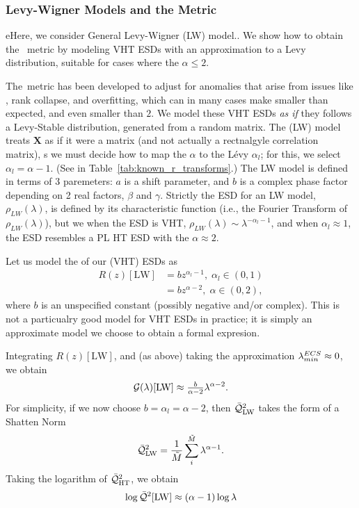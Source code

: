 \subsubsection{Levy-Wigner Models and the \ALPHAHAT Metric}

eHere, we consider General Levy-Wigner (LW) model..
We show how to obtain the \WW~\ALPHAHAT metric by modeling VHT ESDs with an approximation to a Levy distribution, suitable
for cases where the \HTSR $\alpha\le 2$.  

The~\ALPHAHAT metric has been developed to adjust for \SCALE anomalies that arise from issues like \CorrelationTraps,
rank collapse, and overfitting, which can in many cases make \ALPHA smaller than expected, and even smaller than $2$.
We model these VHT ESDs  \emph{as if} they follows a Levy-Stable distribution, generated from a \LevyWigner random matrix.
The  \LevyWigner (LW) model treats  $\mathbf{X}$ as if it were a \Wigner matrix (and not actually a rectnalgyle correlation  matrix),
s we must decide how to map the \HTSR $\alpha$ to the L\'evy $\alpha_{l}$; for this, we select $\alpha_{l}=\alpha-1$.
(See in Table~\ref{tab:known_r_transforms}.)
The LW model is defined in terms of 3 paremeters:
$a$ is a shift parameter, and $b$ is a complex phase factor depending on 2 real factors, $\beta$ and $\gamma$.
Strictly the ESD for an LW model, $\rho_{LW}(\lambda)$, is defined by its characteristic function (i.e., the Fourier Transform of $\rho_{LW}(\lambda)$), but we  when the ESD is VHT, $\rho_{LW}(\lambda)\sim\lambda^{-\alpha_{l}-1}$, and  when $\alpha_{l}\approx 1$, the ESD resembles a PL HT ESD with the \HTSR $\alpha\approx 2$.

Let us model the \RTransform of our \VeryHeavyTailed (VHT) ESDs as
\begin{align}
\label{eqn:LW_model_0} 
R(z)[\mathrm{LW}] & = bz^{\alpha_{l}-1},\;\alpha_{l}\in(0,1) \\ \nonumber
  & = bz^{\alpha-2},\;\alpha\in(0,2),
\end{align}
where $b$ is an unspecified constant (possibly negative and/or complex).
This is not a particualry good model for VHT ESDs in practice; it is simply an approximate model
we choose to obtain a formal expresion.

Integrating $R(z)[\mathrm{LW}]$, and (as above) taking the approximation $\lambda^{ECS}_{min}\approx 0$, we obtain 
\begin{equation}
\label{eqn:LW_model_1} 
\mathcal{G(\lambda)}[\mathrm{LW}] \approx \tfrac{b}{\alpha-2} \lambda^{\alpha-2}  .
\end{equation}
%
For simplicity, if we now choose $b=\alpha_{l}=\alpha-2$, then  $\bar{\mathcal{Q}}^{2}_{\mathrm{LW}}$ takes the form of a Shatten Norm
\begin{equation}
  \label{eqn:LW_model_2}
  \bar{\mathcal{Q}}^{2}_{\mathrm{LW}} = \frac{1}{\tilde{M}}\sum_{i}^{\tilde{M}}\lambda^{\alpha-1}  .
\end{equation}
%
Taking the logarithm of $\bar{\mathcal{Q}}^{2}_{\mathrm{HT}} $, we obtain 
\begin{equation}
\label{eqn:LW_model_3} 
\log \bar{\mathcal{Q}}^{2}[\mathrm{LW}] \approx (\alpha-1)\log\lambda
\end{equation}

